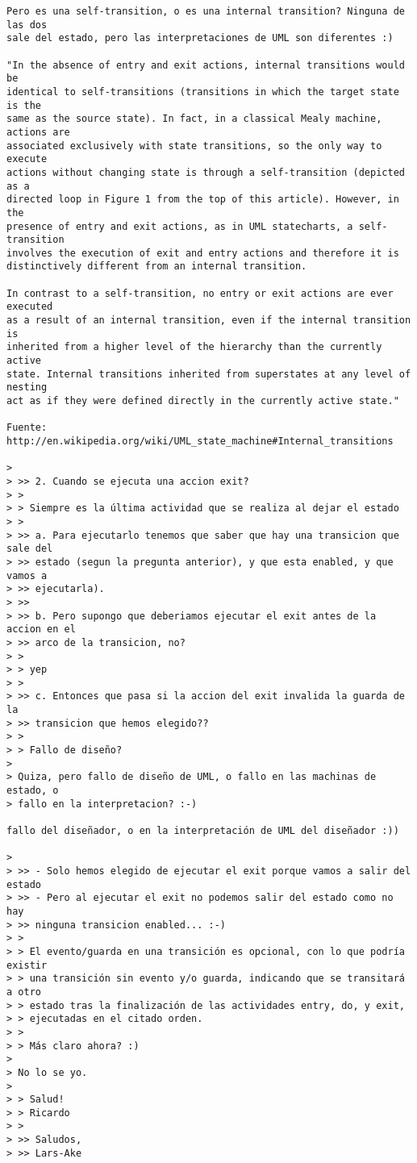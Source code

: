\begin{verbatim}
Pero es una self-transition, o es una internal transition? Ninguna de las dos 
sale del estado, pero las interpretaciones de UML son diferentes :)

"In the absence of entry and exit actions, internal transitions would be 
identical to self-transitions (transitions in which the target state is the 
same as the source state). In fact, in a classical Mealy machine, actions are 
associated exclusively with state transitions, so the only way to execute 
actions without changing state is through a self-transition (depicted as a 
directed loop in Figure 1 from the top of this article). However, in the 
presence of entry and exit actions, as in UML statecharts, a self-transition 
involves the execution of exit and entry actions and therefore it is 
distinctively different from an internal transition.

In contrast to a self-transition, no entry or exit actions are ever executed 
as a result of an internal transition, even if the internal transition is 
inherited from a higher level of the hierarchy than the currently active 
state. Internal transitions inherited from superstates at any level of nesting 
act as if they were defined directly in the currently active state."

Fuente: http://en.wikipedia.org/wiki/UML_state_machine#Internal_transitions

> 
> >> 2. Cuando se ejecuta una accion exit?
> > 
> > Siempre es la última actividad que se realiza al dejar el estado
> > 
> >> a. Para ejecutarlo tenemos que saber que hay una transicion que sale del
> >> estado (segun la pregunta anterior), y que esta enabled, y que vamos a
> >> ejecutarla).
> >> 
> >> b. Pero supongo que deberiamos ejecutar el exit antes de la accion en el
> >> arco de la transicion, no?
> > 
> > yep
> > 
> >> c. Entonces que pasa si la accion del exit invalida la guarda de la
> >> transicion que hemos elegido??
> > 
> > Fallo de diseño?
> 
> Quiza, pero fallo de diseño de UML, o fallo en las machinas de estado, o
> fallo en la interpretacion? :-)

fallo del diseñador, o en la interpretación de UML del diseñador :))

> 
> >> - Solo hemos elegido de ejecutar el exit porque vamos a salir del estado
> >> - Pero al ejecutar el exit no podemos salir del estado como no hay
> >> ninguna transicion enabled... :-)
> > 
> > El evento/guarda en una transición es opcional, con lo que podría existir
> > una transición sin evento y/o guarda, indicando que se transitará a otro
> > estado tras la finalización de las actividades entry, do, y exit,
> > ejecutadas en el citado orden.
> > 
> > Más claro ahora? :)
> 
> No lo se yo.
> 
> > Salud!
> > Ricardo
> > 
> >> Saludos,
> >> Lars-Ake


\end{verbatim}

